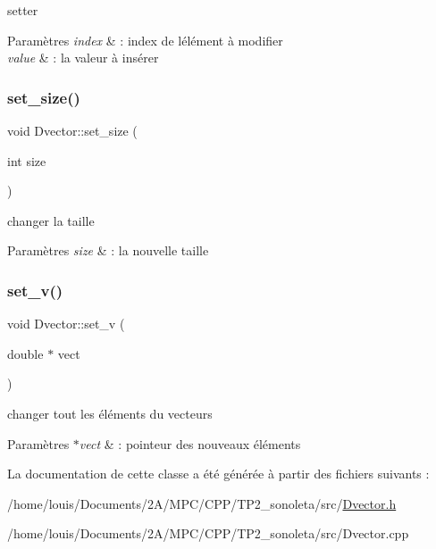 setter 


\begin{DoxyParams}{Paramètres}
{\em index} & \+: index de l\textquotesingle{}élément à modifier \\
\hline
{\em value} & \+: la valeur à insérer \\
\hline
\end{DoxyParams}
\mbox{\label{class_dvector_a5d4b7a3273803031a7fb2b5516e5dd11}} 
\subsubsection{\texorpdfstring{set\+\_\+size()}{set\_size()}}
{\footnotesize\ttfamily void Dvector\+::set\+\_\+size (\begin{DoxyParamCaption}\item[{int}]{size }\end{DoxyParamCaption})}



changer la taille 


\begin{DoxyParams}{Paramètres}
{\em size} & \+: la nouvelle taille \\
\hline
\end{DoxyParams}
\mbox{\label{class_dvector_a99c6f3bc6f2d285ec2f9d8bd32a32218}} 
\subsubsection{\texorpdfstring{set\+\_\+v()}{set\_v()}}
{\footnotesize\ttfamily void Dvector\+::set\+\_\+v (\begin{DoxyParamCaption}\item[{double $\ast$}]{vect }\end{DoxyParamCaption})}



changer tout les éléments du vecteurs 


\begin{DoxyParams}{Paramètres}
{\em $\ast$vect} & \+: pointeur des nouveaux éléments \\
\hline
\end{DoxyParams}


La documentation de cette classe a été générée à partir des fichiers suivants \+:\begin{DoxyCompactItemize}
\item 
/home/louis/\+Documents/2\+A/\+M\+P\+C/\+C\+P\+P/\+T\+P2\+\_\+sonoleta/src/\hyperlink{_dvector_8h}{Dvector.\+h}\item 
/home/louis/\+Documents/2\+A/\+M\+P\+C/\+C\+P\+P/\+T\+P2\+\_\+sonoleta/src/Dvector.\+cpp\end{DoxyCompactItemize}
